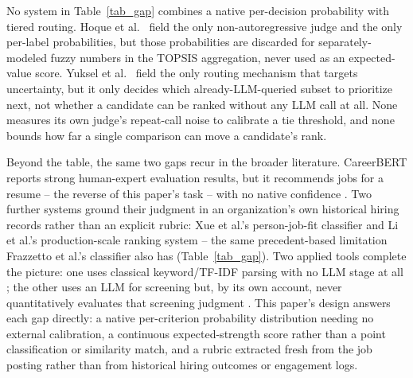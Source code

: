 \documentclass[journal]{IEEEtran}
\begin{document}
No system in Table~\ref{tab_gap} combines a native per-decision probability with tiered routing. Hoque et al.\ \cite{ref12} field the only non-autoregressive judge and the only per-label probabilities, but those probabilities are discarded for separately-modeled fuzzy numbers in the TOPSIS aggregation, never used as an expected-value score. Yuksel et al.\ \cite{ref1} field the only routing mechanism that targets uncertainty, but it only decides which already-LLM-queried subset to prioritize next, not whether a candidate can be ranked without any LLM call at all. None measures its own judge's repeat-call noise to calibrate a tie threshold, and none bounds how far a single comparison can move a candidate's rank.

Beyond the table, the same two gaps recur in the broader literature. CareerBERT reports strong human-expert evaluation results, but it recommends jobs for a resume -- the reverse of this paper's task -- with no native confidence \cite{ref14}. Two further systems ground their judgment in an organization's own historical hiring records rather than an explicit rubric: Xue et al.'s person-job-fit classifier \cite{ref17} and Li et al.'s production-scale ranking system \cite{ref18} -- the same precedent-based limitation Frazzetto et al.'s classifier also has (Table~\ref{tab_gap}). Two applied tools complete the picture: one uses classical keyword/TF-IDF parsing with no LLM stage at all \cite{ref15}; the other uses an LLM for screening but, by its own account, never quantitatively evaluates that screening judgment \cite{ref16}. This paper's design answers each gap directly: a native per-criterion probability distribution needing no external calibration, a continuous expected-strength score rather than a point classification or similarity match, and a rubric extracted fresh from the job posting rather than from historical hiring outcomes or engagement logs.
\end{document}
